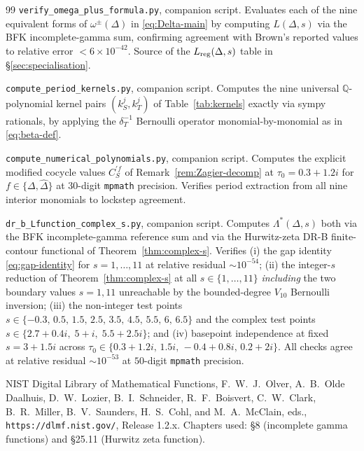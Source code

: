 \documentclass[11pt,letterpaper]{article}
\newcommand{\QQ}{\mathbb{Q}}
\newcommand{\Dhat}{\widehat{\Delta}}
\begin{document}
\begin{thebibliography}{99}
\texttt{verify\_omega\_plus\_formula.py}, companion script.  Evaluates
each of the nine equivalent forms of $\omega^\pm(\Delta)$ in
\eqref{eq:Delta-main} by computing $L(\Delta, s)$ via the BFK
incomplete-gamma sum, confirming agreement with Brown's reported values
to relative error $< 6\times 10^{-42}$.  Source of the
$L_{\rm reg}(\Delta, s)$ table in \S\ref{sec:specialisation}.

\texttt{compute\_period\_kernels.py}, companion script.  Computes the
nine universal $\QQ$-polynomial kernel pairs $(k_S^j, k_T^j)$ of
Table~\ref{tab:kernels} exactly via sympy rationals, by applying the
$\delta_T^{-1}$ Bernoulli operator monomial-by-monomial as in
\eqref{eq:beta-def}.

\texttt{compute\_numerical\_polynomials.py}, companion script.  Computes
the explicit modified cocycle values $C^{\prime f}_S$ of
Remark~\ref{rem:Zagier-decomp} at $\tau_0 = 0.3 + 1.2i$ for
$f \in \{\Delta, \Dhat\}$ at $30$-digit \texttt{mpmath} precision.
Verifies period extraction from all nine interior monomials to lockstep
agreement.

\texttt{dr\_b\_Lfunction\_complex\_s.py}, companion script.  Computes
$\Lambda^*(\Delta, s)$ both via the BFK incomplete-gamma reference
sum and via the Hurwitz-zeta DR-B finite-contour functional of
Theorem~\ref{thm:complex-s}.  Verifies (i) the gap identity
\eqref{eq:gap-identity} for $s = 1, \ldots, 11$ at relative residual
$\sim 10^{-54}$; (ii) the integer-$s$ reduction of
Theorem~\ref{thm:complex-s} at all $s \in \{1, \ldots, 11\}$
\emph{including} the two boundary values $s = 1, 11$ unreachable by the
bounded-degree $V_{10}$ Bernoulli inversion; (iii) the non-integer test
points $s \in \{-0.3,\,0.5,\,1.5,\,2.5,\,3.5,\,4.5,\,5.5,\,6,\,6.5\}$
and the complex test points $s \in \{2.7 + 0.4i,\;5 + i,\;5.5 + 2.5i\}$;
and (iv) basepoint independence at fixed $s = 3 + 1.5i$ across
$\tau_0 \in \{0.3 + 1.2i,\,1.5i,\,-0.4 + 0.8i,\,0.2 + 2i\}$.  All checks
agree at relative residual $\sim 10^{-53}$ at $50$-digit
\texttt{mpmath} precision.

NIST Digital Library of Mathematical Functions, F.~W.~J.\ Olver,
A.~B.\ Olde Daalhuis, D.~W.\ Lozier, B.~I.\ Schneider, R.~F.\ Boisvert,
C.~W.\ Clark, B.~R.\ Miller, B.~V.\ Saunders, H.~S.\ Cohl, and
M.~A.\ McClain, eds., \texttt{https://dlmf.nist.gov/}, Release 1.2.x.
Chapters used: \S 8 (incomplete gamma functions) and \S 25.11
(Hurwitz zeta function).


\end{thebibliography}
\end{document}
